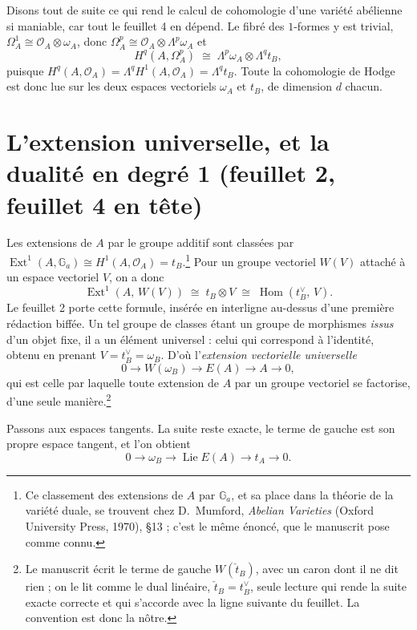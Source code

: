 \documentclass[11pt,a4paper]{article}
\begin{document}
Disons tout de suite ce qui rend le calcul de cohomologie
d'une variété abélienne si maniable, car tout le feuillet 4 en dépend. Le
fibré des $1$-formes y est trivial, $\Omega^1_A \cong \mathcal{O}_A \otimes
\omega_A$, donc $\Omega^p_A \cong \mathcal{O}_A \otimes \Lambda^p \omega_A$ et
\[
  H^q(A, \Omega^p_A) \;\cong\; \Lambda^p \omega_A \otimes \Lambda^q t_B ,
\]
puisque $H^q(A, \mathcal{O}_A) = \Lambda^q H^1(A, \mathcal{O}_A) = \Lambda^q
t_B$. Toute la cohomologie de Hodge est donc lue sur les deux espaces
vectoriels $\omega_A$ et $t_B$, de dimension $d$ chacun.

\section*{L'extension universelle, et la dualité en degré 1 (feuillet 2, feuillet 4 en tête)}

Les extensions de $A$ par le groupe additif sont classées par
$\operatorname{Ext}^1(A, \mathbb{G}_a) \cong H^1(A, \mathcal{O}_A) = t_B$.\footnote{Ce
classement des extensions de $A$ par $\mathbb{G}_a$, et sa place dans la
théorie de la variété duale, se trouvent chez D.~Mumford, \emph{Abelian
Varieties} (Oxford University Press, 1970), §13 ; c'est le même énoncé, que le
manuscrit pose comme connu.}
Pour un groupe vectoriel $W(V)$ attaché à un espace vectoriel $V$, on a donc
\[
  \operatorname{Ext}^1\!\left(A,\, W(V)\right) \;\cong\; t_B \otimes V
  \;\cong\; \operatorname{Hom}\!\left(t_B^{\vee},\, V\right).
\]
Le feuillet 2 porte cette formule, insérée en interligne au-dessus d'une
première rédaction biffée. Un tel groupe de classes étant un groupe de
morphismes \emph{issus} d'un objet fixe, il a un élément universel : celui qui
correspond à l'identité, obtenu en prenant $V = t_B^{\vee} = \omega_B$. D'où
l'\emph{extension vectorielle universelle}
\[
  0 \longrightarrow W(\omega_B) \longrightarrow E(A) \longrightarrow A
    \longrightarrow 0 ,
\]
qui est celle par laquelle toute extension de $A$ par un groupe vectoriel se
factorise, d'une seule manière.\footnote{Le manuscrit écrit le terme de gauche
$W(\check{t}_B)$, avec un caron dont il ne dit rien ; on le lit comme le dual
linéaire, $\check{t}_B = t_B^{\vee}$, seule lecture qui rende la suite exacte
correcte et qui s'accorde avec la ligne suivante du feuillet. La convention est
donc la nôtre.}

Passons aux espaces tangents. La suite reste exacte, le terme de gauche est son
propre espace tangent, et l'on obtient
\[
  0 \longrightarrow \omega_B \longrightarrow \operatorname{Lie} E(A)
    \longrightarrow t_A \longrightarrow 0 .
\]
\end{document}
